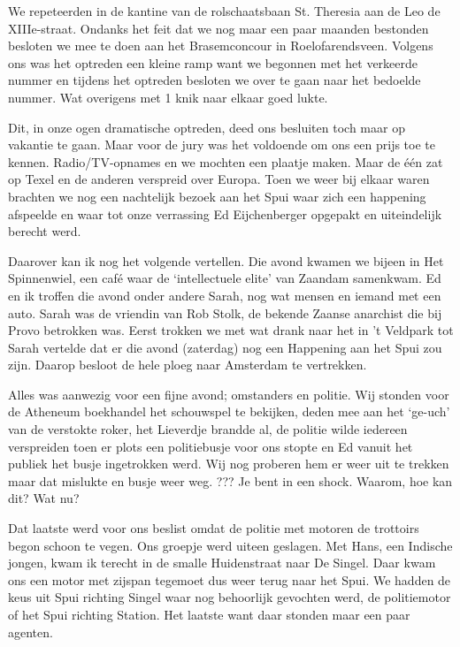 \documentclass[10pt,twoside,openright]{memoir}
\begin{document}
We repeteerden in de kantine van de rolschaatsbaan St. Theresia aan de Leo de XIIIe-straat. Ondanks het feit dat we nog maar een paar maanden bestonden besloten we mee te doen aan het Brasemconcour in Roelofarendsveen. Volgens ons was het optreden een kleine ramp want we begonnen met het verkeerde nummer en tijdens het optreden besloten we over te gaan naar het bedoelde nummer. Wat overigens met 1 knik naar elkaar goed lukte. 

Dit, in onze ogen dramatische optreden, deed ons besluiten toch maar op vakantie te gaan. Maar voor de jury was het voldoende om ons een prijs toe te kennen. Radio/TV-opnames en we mochten een plaatje maken. Maar de één zat op Texel en de anderen verspreid over Europa. Toen we weer bij elkaar waren brachten we nog een nachtelijk bezoek aan het Spui waar zich een happening afspeelde en waar tot onze verrassing Ed Eijchenberger opgepakt en uiteindelijk berecht werd.

Daarover kan ik nog het volgende vertellen. Die avond kwamen we bijeen in Het Spinnenwiel, een café waar de ‘intellectuele elite’ van Zaandam samenkwam. Ed en ik troffen die avond onder andere Sarah, nog wat mensen en iemand met een auto. Sarah was de vriendin van Rob Stolk, de bekende Zaanse anarchist die bij Provo betrokken was. Eerst trokken we met wat drank naar het in ’t Veldpark tot Sarah vertelde dat er die avond (zaterdag) nog een Happening aan het Spui zou zijn. Daarop besloot de hele ploeg naar Amsterdam te vertrekken. 

Alles was aanwezig voor een fijne avond; omstanders en politie. Wij stonden voor de Atheneum boekhandel het schouwspel te bekijken, deden mee aan het ‘ge-uch’ van de verstokte roker, het Lieverdje brandde al, de politie wilde iedereen verspreiden toen er plots een politiebusje voor ons stopte en Ed vanuit het publiek het busje ingetrokken werd. Wij nog proberen hem er weer uit te trekken maar dat mislukte en busje weer weg. ??? Je bent in een shock. Waarom, hoe kan dit? Wat nu? 

Dat laatste werd voor ons beslist omdat de politie met motoren de trottoirs begon schoon te vegen. Ons groepje werd uiteen geslagen. Met Hans, een Indische jongen, kwam ik terecht in de smalle Huidenstraat naar De Singel. Daar kwam ons een motor met zijspan tegemoet dus weer terug naar het Spui. We hadden de keus uit Spui richting Singel waar nog behoorlijk gevochten werd, de politiemotor of het Spui richting Station. Het laatste want daar stonden maar een paar agenten. 
\end{document}
